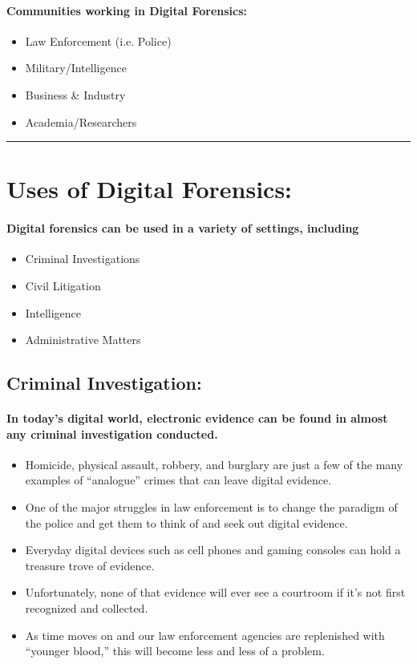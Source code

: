 \documentclass[british]{article}
\begin{document}
\paragraph{Communities working in Digital Forensics:}
\begin{itemize}
\item Law Enforcement (i.e. Police) 
\item Military/Intelligence
\item Business \& Industry 
\item Academia/Researchers 
\end{itemize}
\rule[0.5ex]{0.75\columnwidth}{1pt}

\vfill{}


\section{Uses of Digital Forensics:}

\paragraph*{Digital forensics can be used in a variety of settings, including}
\begin{itemize}
\item Criminal Investigations 
\item Civil Litigation 
\item Intelligence 
\item Administrative Matters 
\end{itemize}

\subsection{Criminal Investigation:}

\paragraph{In today\textquoteright s digital world, electronic evidence can
be found in almost any criminal investigation conducted. }
\begin{itemize}
\item Homicide, physical assault, robbery, and burglary are just a few of
the many examples of ``analogue'' crimes that can leave digital
evidence. 
\item One of the major struggles in law enforcement is to change the paradigm
of the police and get them to think of and seek out digital evidence. 
\item Everyday digital devices such as cell phones and gaming consoles can
hold a treasure trove of evidence. 
\item Unfortunately, none of that evidence will ever see a courtroom if
it's not first recognized and collected. 
\item As time moves on and our law enforcement agencies are replenished
with ``younger blood,'' this will become less and less of a problem. 
\end{itemize}
\end{document}
